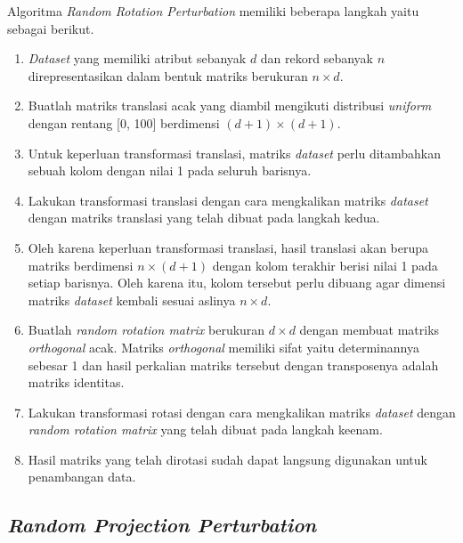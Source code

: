 Algoritma \textit{Random Rotation Perturbation} memiliki beberapa langkah yaitu sebagai berikut.
\begin{enumerate}
    \item \textit{Dataset} yang memiliki atribut sebanyak \(d\) dan rekord sebanyak \(n\) direpresentasikan dalam bentuk matriks berukuran \(n \times d\).
    \item Buatlah matriks translasi acak yang diambil mengikuti distribusi \textit{uniform} dengan rentang [0, 100] berdimensi \((d+1)\times(d+1)\).
    \item Untuk keperluan transformasi translasi, matriks \textit{dataset} perlu ditambahkan sebuah kolom dengan nilai 1 pada seluruh barisnya.
    \item Lakukan transformasi translasi dengan cara mengkalikan matriks \textit{dataset} dengan matriks translasi yang telah dibuat pada langkah kedua.
    \item Oleh karena keperluan transformasi translasi, hasil translasi akan berupa matriks berdimensi \(n\times(d+1)\) dengan kolom terakhir berisi nilai 1 pada setiap barisnya. Oleh karena itu, kolom tersebut perlu dibuang agar dimensi matriks \textit{dataset} kembali sesuai aslinya \(n \times d\).
    \item Buatlah \textit{random rotation matrix} berukuran \(d \times d\) dengan membuat matriks \textit{orthogonal} acak. Matriks \textit{orthogonal} memiliki sifat yaitu determinannya sebesar 1 dan hasil perkalian matriks tersebut dengan transposenya adalah matriks identitas.
    \item Lakukan transformasi rotasi dengan cara mengkalikan matriks \textit{dataset} dengan \textit{random rotation matrix} yang telah dibuat pada langkah keenam.
    \item Hasil matriks yang telah dirotasi sudah dapat langsung digunakan untuk penambangan data.
\end{enumerate}

\subsection{\textit{Random Projection Perturbation}}
\label{subsec:rpp}

